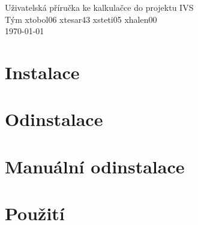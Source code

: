 \documentclass[a4paper, 11pt]{article}
\begin{document}
    \begin{center}
        \LARGE Uživatelská příručka ke kalkulačce do projektu IVS\\[0.4em]

        \Large Tým xtobol06 xtesar43 xsteti05 xhalen00\\[0.4em]

        \Large \today
    \end{center}

    \tableofcontents
    \newpage

    \section{Instalace}
	\section{Odinstalace}
	\section{Manuální odinstalace}
	\section{Použití}
\end{document}
